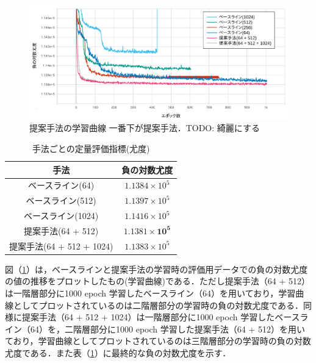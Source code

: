 \begin{figure}[tp]
    \begin{center}
        \includegraphics[width=\linewidth]{./figures/curve.png}
        \caption[提案手法の学習曲線]{提案手法の学習曲線 一番下が提案手法．TODO: 綺麗にする}
        \label{fig:curve}
    \end{center}
    \end{figure}

\begin{table}[tbp]
    \begin{center}
    \caption{手法ごとの定量評価指標(尤度)}
    \begin{tabular}{|c||c|} \hline
      手法 & 負の対数尤度 \\ \hline \hline
      ベースライン(64) & $1.1384 \times 10^5 $ \\ \hline
      ベースライン(512) & $1.1397 \times 10^5 $ \\ \hline
      ベースライン(1024) & $1.1416 \times 10^5 $ \\ \hline
      提案手法(64 + 512) & $\bm{1.1381 \times 10^5 }$ \\ \hline
      提案手法(64 + 512 + 1024) & $1.1383 \times 10^5$ \\ \hline
    \end{tabular}
    \label{table:evaluation}
    \end{center}
  \end{table}
  

図（\ref{fig:curve}）は，ベースラインと提案手法の学習時の評価用データでの負の対数尤度の値の推移をプロットしたもの(学習曲線)である．ただし提案手法（64 + 512）は一階層部分に1000 epoch 学習したベースライン（64）を用いており，学習曲線としてプロットされているのは二階層部分の学習時の負の対数尤度である．同様に提案手法（64 + 512 + 1024）は一階層部分に1000 epoch 学習したベースライン（64）を，二階層部分に1000 epoch 学習した提案手法（64 + 512）を用いており，学習曲線としてプロットされているのは三階層部分の学習時の負の対数尤度である．また表（\ref{table:evaluation}）に最終的な負の対数尤度を示す．

